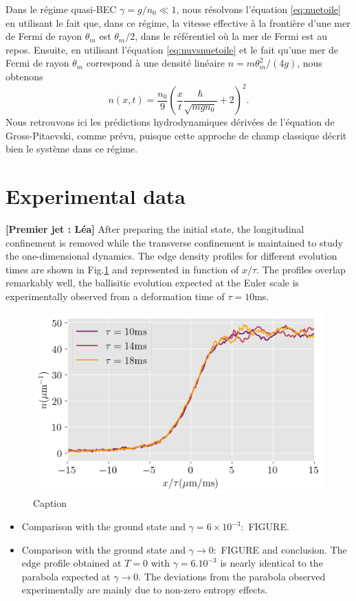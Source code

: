 \documentclass[submission, Phys]{SciPost}
\begin{document}
{Dans le régime quasi-BEC $\gamma=g/n_0\ll 1$, nous résolvons l'équation \eqref{eq:nuetoile} en utilisant le fait que, dans ce régime, la vitesse effective à la frontière d'une mer de Fermi de rayon $\theta_m$ est 
$\theta_m/2$, dans le référentiel où la mer de Fermi est au repos. Ensuite, en utilisant l'équation \eqref{eq:nuvsnuetoile} et le fait qu'une mer de Fermi de rayon $\theta_m$ correspond à une densité linéaire $n=m\theta_m^2/(4 g)$, nous obtenons
\begin{equation}
    n(x,t)= \frac{n_0}{9}\left ( \frac{x}{t}\frac{\hbar}{\sqrt{mgn_0}} +2 \right )^2  .
\end{equation}
Nous retrouvons ici les prédictions hydrodynamiques dérivées de l'équation de Gross-Pitaevski\cite{el_decay_1995,xu_dispersive_2017}, comme prévu, puisque cette approche de champ classique décrit bien le système dans ce régime. 

}

\section{Experimental data}
{\bf [Premier jet : Léa]}
After preparing the initial state, the longitudinal confinement is removed while the transverse confinement is maintained to study the one-dimensional dynamics. The edge density profiles for different evolution times are shown in Fig.\ref{fig:euler} and represented in function of $x /\tau$. The profiles overlap remarkably well, the ballisitic evolution expected at the Euler scale is experimentally observed from a deformation time of $\tau = 10$ms. 

\begin{figure}[!htb]
    \centering
    \includegraphics[width=0.7\linewidth]{Figures/Hydroscaling_DWD.png}
    \caption{Caption}
    \label{fig:euler}
\end{figure}



\begin{itemize}
    \item Comparison with the ground state and $\gamma = 6 \times 10^{-3} : $ FIGURE. 
    \item Comparison with the ground state and $\gamma \to 0 : $ FIGURE and conclusion. The edge profile obtained at $T=0$ with $\gamma = 6.10^{-3}$ is nearly identical to the parabola expected at $\gamma \to 0$. The deviations from the parabola observed experimentally are mainly due to non-zero entropy effects. 
\end{itemize}
\end{document}

